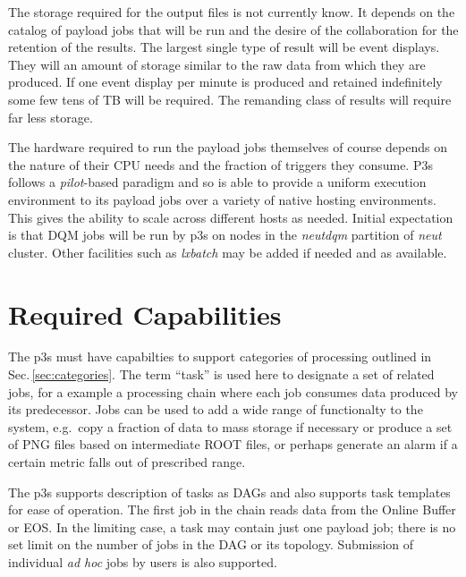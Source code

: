 \documentclass[pdftex,12pt,letter]{article}
\begin{document}
The storage required for the output files is not currently know.  It
depends on the catalog of payload jobs that will be run and the desire
of the collaboration for the retention of the results.  The largest
single type of result will be event displays.  They will an amount of
storage similar to the raw data from which they are produced.  If one
event display per minute is produced and retained indefinitely some
few tens of TB will be required.  The remanding class of results will
require far less storage.

The hardware required to run the payload jobs themselves of course
depends on the nature of their CPU needs and the fraction of triggers
they consume.  P3s follows a \textit{pilot}-based paradigm and so is
able to provide a uniform execution environment to its payload jobs
over a variety of native hosting environments.  This gives the ability
to scale across different hosts as needed.  Initial expectation is
that DQM jobs will be run by p3s on nodes in the \textit{neutdqm}
partition of \textit{neut} cluster.  Other facilities such as
\textit{lxbatch} \cite{lxbatch} may be added if needed and as available.


\section{Required Capabilities}
\label{sec:capabilities}

The p3s must have capabilties to support categories of processing outlined
in Sec.\,\ref{sec:categories}. The term ``task'' is used here to designate a set
of related jobs, for a example a processing chain where each job consumes
data produced by its predecessor. Jobs can be used to add a wide range
of functionalty to the system, e.g.~copy a fraction of data to mass storage
if necessary or produce a set of PNG files based on intermediate ROOT files,
or perhaps generate an alarm if a certain metric falls out of prescribed range.

The p3s supports description of tasks as DAGs and also supports task templates
for ease of operation. The first job in the chain reads data from
the Online Buffer or EOS. In the limiting case, a task may contain just one payload
job; there is no set limit on the number of jobs in the DAG or its topology.
Submission of individual \textit{ad hoc} jobs by users is also supported.
\end{document}

